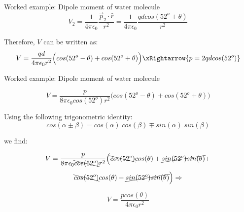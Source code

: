 {\begin{frame}{Worked example: Dipole moment of water molecule}
  \begin{equation*}
    V_2 = \frac{1}{4\pi \epsilon_0} \frac{\vec{p}_2 \cdot \hat{r}}{r^2}
        = \frac{1}{4\pi \epsilon_0} \frac{qd cos(52^o + \theta)}{r^2}
  \end{equation*}

Therefore, $V$ can be written as:
  \begin{equation*}
    V = \frac{qd}{4\pi \epsilon_0 r^2}
       \Big( cos(52^o - \theta) + cos(52^o + \theta) \Big) \xRightarrow{p = 2 q d cos(52^o)}
  \end{equation*}

\end{frame}

%
%
%

\begin{frame}{Worked example: Dipole moment of water molecule}

  \begin{equation*}
    V = \frac{p}{8\pi \epsilon_0 cos(52^o) r^2}
       \Big( cos(52^o - \theta) + cos(52^o + \theta) \Big)
  \end{equation*}

Using the following trigonometric identity:
  \begin{equation*}
    cos(\alpha \pm \beta) = cos(\alpha) \; cos(\beta) \mp sin(\alpha) \; sin(\beta)
  \end{equation*}

we find:

  \begin{equation*}
    V = \frac{p}{8\pi \epsilon_0 \bcancel{cos(52^o)} r^2}
       \Big( \bcancel{cos(52^o)} cos(\theta) + \cancel{sin(52^o) sin(\theta)} +
  \end{equation*}
  \begin{equation*}
             \bcancel{cos(52^o)} cos(\theta) - \cancel{sin(52^o) sin(\theta)} \Big) \Rightarrow
  \end{equation*}

  \begin{equation*}
    V = \frac{p cos(\theta)}{4\pi \epsilon_0 r^2}
  \end{equation*}

\end{frame}

} %

